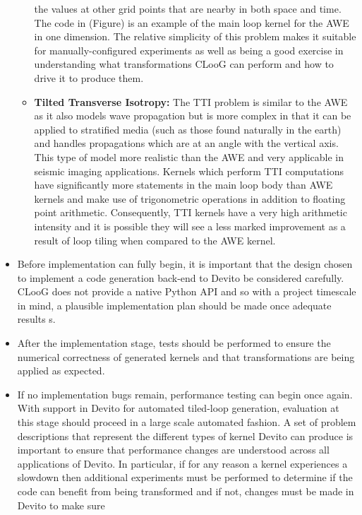 \documentclass[a4paper,12pt,twoside]{report}
\begin{document}
\begin{itemize}
\begin{itemize}
                the values at other grid points that are nearby in both space and time. The code in (Figure) is an example of the main loop kernel for the AWE 
                in one dimension. The relative simplicity of this problem makes it suitable for manually-configured experiments as well as being a good exercise 
                in understanding what transformations CLooG can perform and how to drive it to produce them.
            \item \textbf{Tilted Transverse Isotropy:} The TTI problem is similar to the AWE as it also models wave propagation but is more complex in that it can be
                applied to stratified media (such as those found naturally in the earth) and handles propagations which are at an angle with the vertical axis. This
                type of model more realistic than the AWE and very applicable in seismic imaging applications. Kernels which perform TTI computations
                have significantly more statements in the main loop body than AWE kernels and make use of trigonometric operations in addition to floating point 
                arithmetic. Consequently, TTI kernels have a very high arithmetic intensity and it is possible they will see a less marked improvement as a result
                of loop tiling when compared to the AWE kernel.
        \end{itemize}
    \item Before implementation can fully begin, it is important that the design chosen to implement a code generation back-end to Devito be considered carefully.
        CLooG does not provide a native Python API and so with a project timescale in mind, a plausible implementation plan should be made once adequate results s.
    \item After the implementation stage, tests should be performed to ensure the numerical correctness of generated kernels and that transformations are
        being applied as expected.
    \item If no implementation bugs remain, performance testing can begin once again. With support in Devito for automated tiled-loop generation, evaluation at this
        stage should proceed in a large scale automated fashion. A set of problem descriptions that represent the different types of kernel Devito can produce is
        important to ensure that performance changes are understood across all applications of Devito. In particular, if for any reason a kernel experiences a slowdown
        then additional experiments must be performed to determine if the code can benefit from being transformed and if not, changes must be made in Devito to make sure

\end{itemize}
\end{document}

